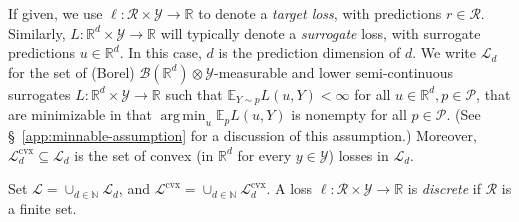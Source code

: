 \documentclass{article} %
\newcommand{\Comments}{0}
\newcommand{\mytodo}[2]{\ifnum\Comments=1%
	\todo[linecolor=#1!80!black,backgroundcolor=#1,bordercolor=#1!80!black]{#2}\fi}
\newcommand{\btw}[1]{}%
\newcommand{\reals}{\mathbb{R}}
\newcommand{\simplex}{\Delta_\Y}
\newcommand{\A}{\mathcal{A}}
\newcommand{\E}{\mathbb{E}}
\renewcommand{\L}{\mathcal{L}}
\newcommand{\Lcvx}{\mathcal{L}^{\mathrm{cvx}}}
\newcommand{\R}{\mathcal{R}}
\renewcommand{\P}{\mathcal{P}}
\newcommand{\Y}{\mathcal{Y}}
\newcommand{\exploss}[3]{\E_{#3} #1(#2,Y)}
\DeclareMathOperator*{\argmin}{arg\,min}
\begin{document}
If given, we use $\ell: \R \times \Y \to \reals$ to denote a \emph{target loss}, with predictions $r\in\R$.
Similarly, $L: \reals^d \times \Y \to \reals$ will typically denote a \emph{surrogate} loss, with surrogate predictions $u \in \reals^d$.
In this case, $d$ is the prediction dimension of $d$.
We write $\L_d $ for the set of (Borel) $\mathcal{B}(\reals^d) \otimes \Y$-measurable and lower semi-continuous surrogates $L : \reals^d \times\Y \to \reals$ such that $\E_{Y \sim p} L(u,Y) < \infty$ for all $u \in \reals^d, p \in \P$, that are minimizable in that $\argmin_{u} \exploss{L}{u}{p}$ is nonempty for all $p\in\P$.
(See \S~\ref{app:minnable-assumption} for a discussion of this assumption.)
Moreover, $\Lcvx_d \subseteq \L_d$ is the set of convex (in $\reals^d$ for every $y \in \Y$) losses in $\L_d$.
\btw{Sufficient condition for $\A$-normal convex integrand: $L$ is lower semi-continuous and $\mathcal{B}(\A) \otimes \Y$-measurable; $\E_p L(u,Y)$ finite for all $u, p$, there exists a $u_0$ for each $p$ so that $\E_p L(u_0, Y)$ is finite and continuous for Rockefellar's corollary, though it's stricter than Ioffe and Tokhimorov IIRC}
Set $\L = \cup_{d \in \mathbb{N}} \L_d$, and $\Lcvx = \cup_{d \in \mathbb{N}} \Lcvx_d$.
A loss $\ell: \R\times \Y \to \reals$ is \emph{discrete} if $\R$ is a finite set.


\end{document}

